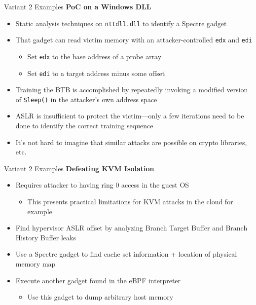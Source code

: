 \documentclass[10pt, dvipsnames, aspectratio=169]{beamer}
\begin{document}
\begin{frame}[c]{Variant 2 Examples}{}
  {\bf PoC on a Windows DLL}
  \begin{itemize}
    \item Static analysis techniques on {\tt nttdll.dll} to identify a Spectre gadget
    \item That gadget can read victim memory with an attacker-controlled \texttt{edx} and \texttt{edi}
    \begin{itemize}
      \item Set {\tt edx} to the base address of a probe array
      \item Set {\tt edi} to a target address minus some offset
    \end{itemize}
    \item Training the BTB is accomplished by repeatedly invoking a modified version of {\tt Sleep()} in the attacker's own address space
    \item ASLR is insufficient to protect the victim---only a few iterations need to be done to identify the correct training sequence
    \item It's not hard to imagine that similar attacks are possible on crypto libraries, etc.
  \end{itemize}
\end{frame}

\begin{frame}[c]{Variant 2 Examples}{}
  {\bf Defeating KVM Isolation}
  \begin{itemize}
    \item Requires attacker to having ring 0 access in the guest OS
    \begin{itemize}
      \item This presents practical limitations for KVM attacks in the cloud for example
    \end{itemize}
    \item Find hypervisor ASLR offset by analyzing Branch Target Buffer and Branch History Buffer leaks
    \item Use a Spectre gadget to find cache set information + location of physical memory map
    \item Execute another gadget found in the eBPF interpreter
    \begin{itemize}
      \item Use this gadget to dump arbitrary host memory
    \end{itemize}
  \end{itemize}
\end{frame}
\end{document}
